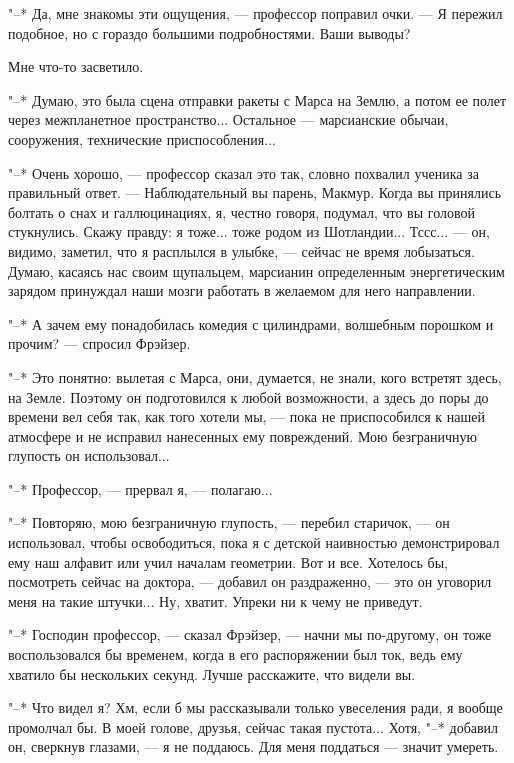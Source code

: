 "--* Да, мне знакомы эти ощущения, --- профессор поправил очки. --- Я  пережил
подобное, но с гораздо большими подробностями. Ваши выводы?

Мне что-то засветило.

"--* Думаю, это была сцена отправки ракеты с Марса на Землю,  а  потом  ее
полет через межпланетное пространство... Остальное ---  марсианские  обычаи,
сооружения, технические приспособления...

"--* Очень хорошо, --- профессор сказал это так, словно похвалил ученика  за
правильный ответ. --- Наблюдательный вы парень, Макмур. Когда  вы  принялись
болтать о снах и галлюцинациях, я, честно говоря, подумал, что вы  головой
стукнулись. Скажу правду: я тоже... тоже родом из Шотландии...  Тссс...  ---
он, видимо,  заметил,  что  я  расплылся  в  улыбке,  ---  сейчас  не  время
лобызаться. Думаю, касаясь нас  своим  щупальцем,  марсианин  определенным
энергетическим зарядом принуждал наши мозги работать в желаемом  для  него
направлении.

"--* А зачем ему понадобилась комедия с цилиндрами, волшебным  порошком  и
прочим? --- спросил Фрэйзер.

"--* Это понятно: вылетая с Марса, они, думается, не знали, кого  встретят
здесь, на Земле. Поэтому он подготовился к любой возможности, а  здесь  до
поры до времени вел себя так, как того хотели мы, --- пока не  приспособился
к  нашей  атмосфере  и  не  исправил  нанесенных  ему   повреждений.   Мою
безграничную глупость он использовал...

"--* Профессор, --- прервал я, --- полагаю...

"--* Повторяю,  мою  безграничную  глупость,  ---  перебил  старичок,  ---  он
использовал,   чтобы   освободиться,   пока   я   с   детской   наивностью
демонстрировал ему наш алфавит или учил  началам  геометрии.  Вот  и  все.
Хотелось бы, посмотреть сейчас на доктора, --- добавил он раздраженно, --- это
он уговорил меня на такие штучки...  Ну,  хватит.  Упреки  ни  к  чему  не
приведут.

"--* Господин профессор, --- сказал Фрэйзер, --- начни мы по-другому, он  тоже
воспользовался бы временем, когда в его распоряжении  был  ток,  ведь  ему
хватило бы нескольких секунд. Лучше расскажите, что видели вы.

"--* Что видел я? Хм, если б мы рассказывали  только  увеселения  ради,  я
вообще промолчал бы. В моей голове, друзья, сейчас такая пустота...  Хотя,
"--* добавил он, сверкнув глазами, --- я не  поддаюсь.  Для  меня  поддаться  ---
значит умереть.

